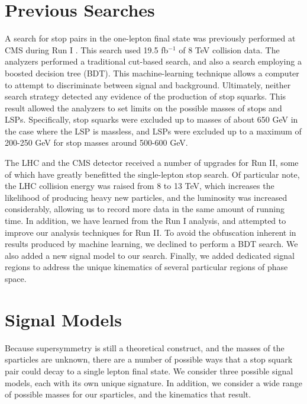 \section{Previous Searches}
\label{sec:stop:run1}

A search for stop pairs in the one-lepton final state was previously
performed at CMS during Run I \cite{stop1l8tev}. This search used 19.5
fb$^{-1}$ of 8 TeV collision data. The analyzers performed a traditional
cut-based search, and also a search employing a boosted decision tree
(BDT). This machine-learning technique allows a computer to attempt to
discriminate between signal and background. Ultimately, neither search
strategy detected any evidence of the production of stop squarks. This
result allowed the analyzers to set limits on the possible masses of
stops and LSPs. Specifically, stop squarks were excluded up to masses
of about 650 GeV in the case where the LSP is massless, and LSPs were
excluded up to a maximum of 200-250 GeV for stop masses around 500-600
GeV.

The LHC and the CMS detector received a number of upgrades for Run II,
some of which have greatly benefitted the single-lepton stop
search. Of particular note, the LHC collision energy was raised from 8
to 13 TeV, which increases the likelihood of producing heavy new
particles, and the luminosity was increased considerably, allowing us %
to record more data in the same amount of running time. In addition,
we have learned from the Run I analysis, and attempted to improve our
analysis techniques for Run II. To avoid the obfuscation inherent in
results produced by machine learning, we declined to perform a BDT
search. We also added a new signal model to our search. Finally, we
added dedicated signal regions to address the unique kinematics of
several particular regions of phase space.


\section{Signal Models}
\label{sec:stop:sigmodels}

Because supersymmetry is still a theoretical construct, and the masses
of the sparticles are unknown, there are a number of possible
ways that a stop squark pair could decay to a single lepton final
state. We consider three possible signal models, each with its own
unique signature. In addition, we consider a wide range of possible
masses for our sparticles, and the kinematics that result.

